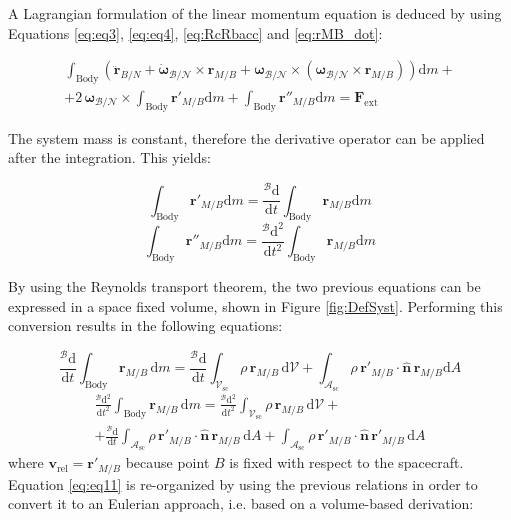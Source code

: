 A Lagrangian formulation of the linear momentum equation is deduced by using Equations \eqref{eq:eq3}, \eqref{eq:eq4}, \eqref{eq:RcRbacc} and \eqref{eq:rMB_dot}: 

\begin{multline}\label{eq:eq11}
	\int_{\text{Body}}\left(\ddot{\bm{r}}_{B/N} + \dot{\bm{\omega}}_{\mathcal{B}/\mathcal{N}}\times\bm{r}_{M/B} + \bm{\omega}_{\mathcal{B}/\mathcal{N}} \times\left(\bm{\omega}_{\mathcal{B}/\mathcal{N}} \times\bm{r}_{M/B}\right)\right)\text{d}m +\\+
	2\,\bm{\omega}_{\mathcal{B}/\mathcal{N}}\times\int_{\text{Body}}\bm{r}'_{M/B}\text{d}m + \int_{\text{Body}}\bm{r}''_{M/B}\text{d}m = \bm{F}_{\text{ext}}
\end{multline}

The system mass is constant, therefore the derivative operator can be applied after the integration. This yields:

\begin{equation}	
	\int_{\text{Body}}\bm{r}'_{M/B}\text{d}m = \frac{^{\mathcal{B}}\text{d}}{\text{d}t}\int_{\text{Body}}\bm{r}_{M/B}\text{d}m
\end{equation}
\begin{equation}
	\int_{\text{Body}}\bm{r}''_{M/B}\text{d}m = \frac{^{\mathcal{B}}\text{d}^2}{\text{d}t^2}\int_{\text{Body}}\bm{r}_{M/B}\text{d}m
\end{equation}

By using the Reynolds transport theorem, the two previous equations can be expressed in a space fixed volume, shown in Figure \ref{fig:DefSyst}. Performing this conversion results in the following equations:

\begin{equation}
	\frac{^{\mathcal{B}}\text{d}}{\text{d}t}\int_{\text{Body}}\bm{r}_{M/B} \,\text{d}m = \frac{^{\mathcal{B}} \text{d}}{\text{d}t}\int_{\mathcal{V}_{\text{sc}}} \rho\,\bm{r}_{M/B}\,\text{d}\mathcal{V} + \int_{\mathcal{A}_{\text{sc}}} \rho\,\bm{r}'_{M/B}\cdot\bm{\hat{n}}\,\bm{r}_{M/B}\text{d}A
\end{equation}
\begin{multline}
	\frac{^{\mathcal{B}}\text{d}^2}{\text{d}t^2}\int_{\text{Body}}\bm{r}_{M/B}\, \text{d}m = \frac{^{\mathcal{B}} \text{d}^2}{\text{d}t^2}\int_{\mathcal{V}_{\text{sc}}} \rho\,\bm{r}_{M/B} \,\text{d}\mathcal{V} +\\+ \frac{^{\mathcal{B}} \text{d}}{\text{d}t} \int_{\mathcal{A}_\text{sc}} \rho\,\bm{r}'_{M/B}\cdot\bm{\hat{n}} \,\bm{r}_{M/B}\,\text{d}A + \int_{\mathcal{A}_\text{sc}} \rho\,\bm{r}'_{M/B}\cdot\bm{\hat{n}} \,\bm{r}'_{M/B}\,\text{d}A
\end{multline}
\noindent
where $\bm{v}_{\text{rel}} = \bm{r}' _{M/B}$ because point $B$ is fixed with respect to the spacecraft.  Equation \eqref{eq:eq11} is re-organized by using the previous relations in order to convert it to an Eulerian approach, i.e. based on a volume-based  derivation:

